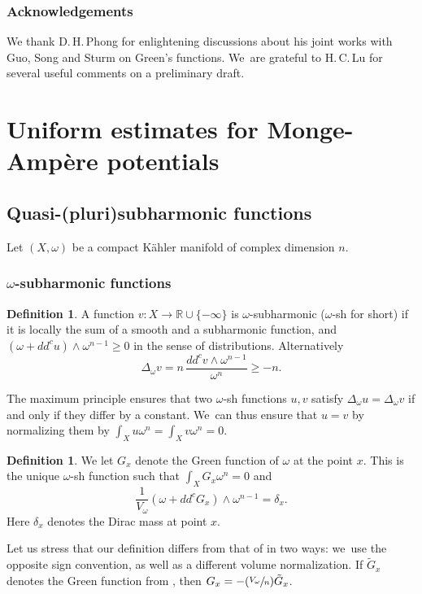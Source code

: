 \documentclass[11pt]{article}
\newcommand{\Subsubsection}{\subsubsection}
\numberwithin{equation}{section}
\newcommand{\Psfrac}[2]{(\sfrac{#1}{#2})}
\theoremstyle{definition}
\newtheorem{defi}[theorem]{Definition}
\newcommand{\R}{\mathbb R}
\begin{document}
\subsubsection*{Acknowledgements}
We thank D.\,H.\,Phong for enlightening discussions about his joint works with Guo, Song and Sturm on Green's functions. We~are grateful to H.\,C.\,Lu for several useful comments on a preliminary draft.

\section{Uniform estimates for Monge-Ampère potentials}

\subsection{Quasi-(pluri)subharmonic functions}

Let $(X, \omega)$ be a compact Kähler manifold of complex dimension $n$.

\Subsubsection{$\omega$-subharmonic functions}

\begin{defi}
A function $v:X \rightarrow \R \cup \{-\infty\}$
is $\omega$-subharmonic ($\omega$-sh for short) if it is locally the sum of a smooth and a subharmonic function, and
$(\omega+dd^c u) \wedge \omega^{n-1} \geq 0$ in the sense of distributions.
Alternatively
\[
\Delta_{\omega} v=n\, \frac{dd^c v \wedge \omega^{n-1}}{\omega^n} \geq -n.
\]
\end{defi}

The maximum principle ensures that two $\omega$-sh functions $u,v$ satisfy $\Delta_{\omega} u=\Delta_{\omega} v$ if and only if they differ by a constant. We~can thus ensure that $u=v$ by normalizing them
by $\int_X u \omega^n=\int_X v \omega^n=0$.

\begin{defi} \label{def:green}
We let $G_x$ denote the Green function of $\omega$ at the point $x$.
This is the unique $\omega$-sh function such that $\int_X G_x \omega^n=0$ and
\[
\frac{1}{V_{\omega}} (\omega+dd^c G_x) \wedge \omega^{n-1}=\delta_x.
\]
Here $\delta_x$ denotes the Dirac mass at point $x$.
\end{defi}

Let us stress that our definition differs from that
of \cite{GPSS22} in two ways: we~use the opposite sign convention, as well as a different volume normalization.
If $\tilde{G}_x$ denotes the Green function from \cite{GPSS22}, then
$G_x=-\Psfrac{V_{\omega}}{n}\tilde{G}_x$.
\end{document}
